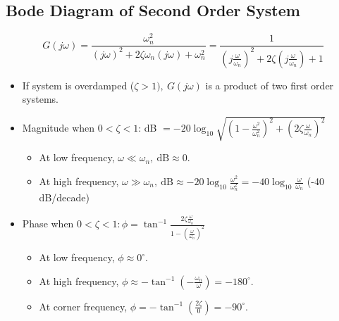 \documentclass[a4paper]{article}
\begin{document}
\subsection{Bode Diagram of Second Order System}
$$G(j\omega) = \frac{\omega_n^2}{(j\omega)^2+2\zeta\omega_n(j\omega)+\omega_n^2} = \frac{1}{\left(j\frac{\omega}{\omega_n}\right)^2+2\zeta\left(j\frac{\omega}{\omega_n}\right)+1}$$
\begin{itemize}
    \item If system is overdamped ($\zeta > 1),\ G(j\omega)$ is a product of two first order systems.
    \item Magnitude when $0<\zeta<1$: 
    dB $= -20\log_{10}\sqrt{\left(1-\frac{\omega^2}{\omega_n^2}\right)^2+\left(2\zeta\frac{\omega}{\omega_n}\right)^2}$
    \begin{itemize}[label=$\circ$]
        \item At low frequency, $\omega\ll\omega_n,\ \text{dB}\approx 0$.
        \item At high frequency, $\omega\gg\omega_n,\ \text{dB}\approx -20\log_{10}\frac{\omega^2}{\omega_n^2} = -40\log_{10}\frac{\omega}{\omega_n}$ \quad (-40 dB/decade)
    \end{itemize}
    \item Phase when $0<\zeta<1: \phi = \tan^{-1}\displaystyle\frac{2\zeta\frac{\omega}{\omega_n}}{1-\left(\frac{\omega}{\omega_n}\right)^2}$
    \begin{itemize}[label=$\circ$]
        \item At low frequency, $\phi \approx 0^\circ$.
        \item At high frequency, $\phi\approx -\tan^{-1}\left(-\frac{\omega_n}{\omega}\right) = -180^\circ$.
        \item At corner frequency, $\phi = -\tan^{-1}\left(\frac{2\zeta}{0}\right)= -90^\circ$.
    \end{itemize}
\end{itemize}
\end{document}
